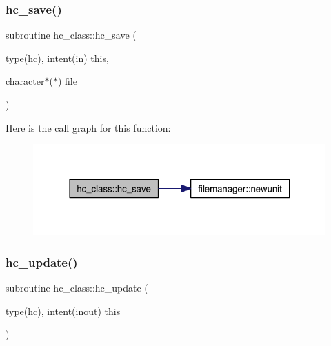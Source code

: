 \mbox{\label{namespacehc__class_ac1fbe6abcc3415c55bd2b920cbb47234}} 
\subsubsection{\texorpdfstring{hc\+\_\+save()}{hc\_save()}}
{\footnotesize\ttfamily subroutine hc\+\_\+class\+::hc\+\_\+save (\begin{DoxyParamCaption}\item[{type(\hyperlink{structhc__class_1_1hc}{hc}), intent(in)}]{this,  }\item[{character$\ast$($\ast$)}]{file }\end{DoxyParamCaption})\hspace{0.3cm}{\ttfamily [private]}}

Here is the call graph for this function\+:\nopagebreak
\begin{figure}[H]
\begin{center}
\leavevmode
\includegraphics[width=322pt]{namespacehc__class_ac1fbe6abcc3415c55bd2b920cbb47234_cgraph}
\end{center}
\end{figure}
\mbox{\label{namespacehc__class_a5b4008b35ac8a501909a4b9aed8fcd71}} 
\subsubsection{\texorpdfstring{hc\+\_\+update()}{hc\_update()}}
{\footnotesize\ttfamily subroutine hc\+\_\+class\+::hc\+\_\+update (\begin{DoxyParamCaption}\item[{type(\hyperlink{structhc__class_1_1hc}{hc}), intent(inout)}]{this }\end{DoxyParamCaption})\hspace{0.3cm}{\ttfamily [private]}}


